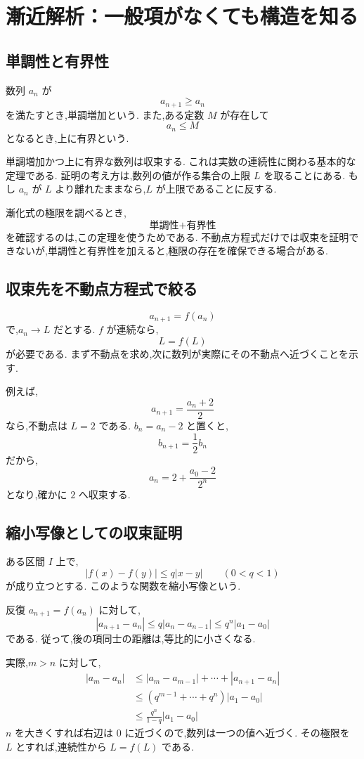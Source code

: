 
\section{漸近解析：一般項がなくても構造を知る}

\subsection{単調性と有界性}

数列 $a_n$ が
\[
  a_{n+1}\geq a_n
\]
を満たすとき,単調増加という.
また,ある定数 $M$ が存在して
\[
  a_n\leq M
\]
となるとき,上に有界という.

単調増加かつ上に有界な数列は収束する.
これは実数の連続性に関わる基本的な定理である.
証明の考え方は,数列の値が作る集合の上限 $L$ を取ることにある.
もし $a_n$ が $L$ より離れたままなら,$L$ が上限であることに反する.

漸化式の極限を調べるとき,
\[
  \text{単調性}+\text{有界性}
\]
を確認するのは,この定理を使うためである.
不動点方程式だけでは収束を証明できないが,単調性と有界性を加えると,極限の存在を確保できる場合がある.

\subsection{収束先を不動点方程式で絞る}

\[
  a_{n+1}=f(a_n)
\]
で,$a_n\to L$ だとする.
$f$ が連続なら,
\[
  L=f(L)
\]
が必要である.
まず不動点を求め,次に数列が実際にその不動点へ近づくことを示す.

例えば,
\[
  a_{n+1}=\frac{a_n+2}{2}
\]
なら,不動点は $L=2$ である.
$b_n=a_n-2$ と置くと,
\[
  b_{n+1}=\frac12b_n
\]
だから,
\[
  a_n=2+\frac{a_0-2}{2^n}
\]
となり,確かに $2$ へ収束する.

\subsection{縮小写像としての収束証明}

ある区間 $I$ 上で,
\[
  |f(x)-f(y)|\leq q|x-y|
  \qquad(0<q<1)
\]
が成り立つとする.
このような関数を縮小写像という.

反復 $a_{n+1}=f(a_n)$ に対して,
\[
  |a_{n+1}-a_n|
  \leq q|a_n-a_{n-1}|
  \leq q^n|a_1-a_0|
\]
である.
従って,後の項同士の距離は,等比的に小さくなる.

実際,$m>n$ に対して,
\[
  \begin{aligned}
    |a_m-a_n|
     & \leq
    |a_m-a_{m-1}|+\cdots+|a_{n+1}-a_n| \\
     & \leq
    (q^{m-1}+\cdots+q^n)|a_1-a_0|      \\
     & \leq
    \frac{q^n}{1-q}|a_1-a_0|
  \end{aligned}
\]
$n$ を大きくすれば右辺は $0$ に近づくので,数列は一つの値へ近づく.
その極限を $L$ とすれば,連続性から $L=f(L)$ である.

